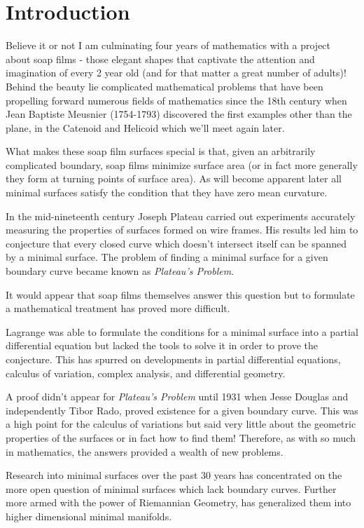 \section{Introduction}

Believe it or not I am culminating four years of mathematics with a project about soap films - those elegant shapes that captivate the attention and imagination of every 2 year old (and for that matter a great number of adults)! Behind the beauty lie complicated mathematical problems that have been propelling forward numerous fields of mathematics since the 18th century when Jean Baptiste Meusnier (1754-1793) discovered the first examples other than the plane, in the Catenoid and Helicoid which we'll meet again later.

What makes these soap film surfaces special is that, given an arbitrarily complicated boundary, soap films minimize surface area (or in fact more generally they form at turning points of surface area). As will become apparent later all minimal surfaces satisfy the condition that they have zero mean curvature.

In the mid-nineteenth century Joseph Plateau carried out experiments accurately measuring the properties of surfaces formed on wire frames. His results led him to conjecture that every closed curve which doesn't intersect itself can be spanned by a minimal surface. The problem of finding a minimal surface for a given boundary curve became known as \emph{Plateau's Problem}.

It would appear that soap films themselves answer this question but to formulate a mathematical treatment has proved more difficult.

Lagrange was able to formulate the conditions for a minimal surface into a partial differential equation but lacked the tools to solve it in order to prove the conjecture. This has spurred on developments in partial differential equations, calculus of variation, complex analysis, and differential geometry.

A proof didn't appear for \emph{Plateau's Problem} until 1931 when Jesse \nohyphens{Douglas} and independently Tibor Rado, proved existence for a given boundary curve. This was a high point for the calculus of variations but said very little about the geometric properties of the surfaces or in fact how to find them! Therefore, as with so much in mathematics, the answers provided a wealth of new problems.

Research into minimal surfaces over the past 30 years has concentrated on the more open question of minimal surfaces which lack boundary curves. Further more armed with the power of Riemannian Geometry, has generalized them into higher dimensional minimal manifolds.

